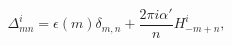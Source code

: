 \begin{equation}
 \Delta^i_{mn} = \epsilon(m)\delta_{m,n} 
          + \frac{2 \pi i \alpha'}{n} H^i_{-m+n} ,
\end{equation}

